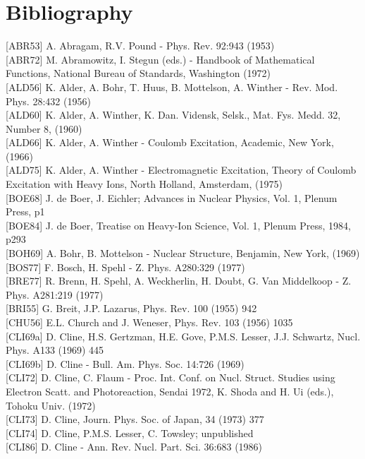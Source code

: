 \documentclass[10pt]{article}
\begin{document}
\section*{Bibliography}
[ABR53] A. Abragam, R.V. Pound - Phys. Rev. 92:943 (1953)\\[0pt]
[ABR72] M. Abramowitz, I. Stegun (eds.) - Handbook of Mathematical Functions, National Bureau of Standards, Washington (1972)\\[0pt]
[ALD56] K. Alder, A. Bohr, T. Huus, B. Mottelson, A. Winther - Rev. Mod. Phys. 28:432 (1956)\\[0pt]
[ALD60] K. Alder, A. Winther, K. Dan. Vidensk, Selsk., Mat. Fys. Medd. 32, Number 8, (1960)\\[0pt]
[ALD66] K. Alder, A. Winther - Coulomb Excitation, Academic, New York, (1966)\\[0pt]
[ALD75] K. Alder, A. Winther - Electromagnetic Excitation, Theory of Coulomb Excitation with Heavy Ions, North Holland, Amsterdam, (1975)\\[0pt]
[BOE68] J. de Boer, J. Eichler; Advances in Nuclear Physics, Vol. 1, Plenum Press, p1\\[0pt]
[BOE84] J. de Boer, Treatise on Heavy-Ion Science, Vol. 1, Plenum Press, 1984, p293\\[0pt]
[BOH69] A. Bohr, B. Mottelson - Nuclear Structure, Benjamin, New York, (1969)\\[0pt]
[BOS77] F. Bosch, H. Spehl - Z. Phys. A280:329 (1977)\\[0pt]
[BRE77] R. Brenn, H. Spehl, A. Weckherlin, H. Doubt, G. Van Middelkoop - Z. Phys. A281:219 (1977)\\[0pt]
[BRI55] G. Breit, J.P. Lazarus, Phys. Rev. 100 (1955) 942\\[0pt]
[CHU56] E.L. Church and J. Weneser, Phys. Rev. 103 (1956) 1035\\[0pt]
[CLI69a] D. Cline, H.S. Gertzman, H.E. Gove, P.M.S. Lesser, J.J. Schwartz, Nucl. Phys. A133 (1969) 445\\[0pt]
[CLI69b] D. Cline - Bull. Am. Phys. Soc. 14:726 (1969)\\[0pt]
[CLI72] D. Cline, C. Flaum - Proc. Int. Conf. on Nucl. Struct. Studies using Electron Scatt. and Photoreaction, Sendai 1972, K. Shoda and H. Ui (eds.), Tohoku Univ. (1972)\\[0pt]
[CLI73] D. Cline, Journ. Phys. Soc. of Japan, 34 (1973) 377\\[0pt]
[CLI74] D. Cline, P.M.S. Lesser, C. Towsley; unpublished\\[0pt]
[CLI86] D. Cline - Ann. Rev. Nucl. Part. Sci. 36:683 (1986)\\[0pt]
\end{document}
